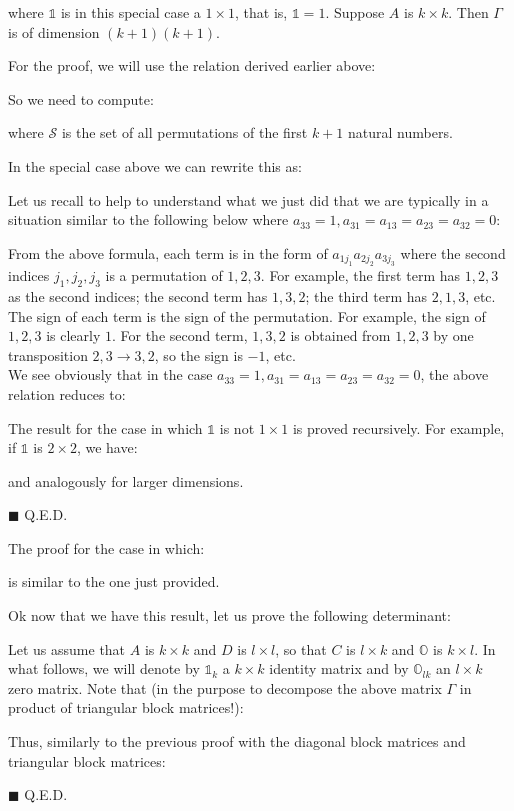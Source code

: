 	where $\mathds{1}$ is in this special case a $1\times 1$, that is, $\mathds{1}=1$. Suppose $A$ is $k \times k$. Then $\Gamma$ is of dimension $(k+1)(k+1)$.  
	
	For the proof, we will use the relation derived earlier above:
	
	\begin{dem}
	So we need to compute:
	
	where $\mathcal{S}$ is the set of all permutations of the first $k+1$ natural numbers.
	
	In the special case above we can rewrite this as:
	
	\begin{tcolorbox}[title=Remark,colframe=black,arc=10pt]
	Let us recall to help to understand what we just did that we are typically in a situation similar to the following below where $a_{33}=1,a_{31}=a_{13}=a_{23}=a_{32}=0$:
	
	From the above formula, each term is in the form of $a_{1j_1}a_{2j_2}a_{3j_3}$ where the second indices $j_1,j_2,j_3$ is a permutation of $1,2,3$. For example, the first term has $1,2,3$ as the second indices; the second term has $1,3,2$; the third term has $2,1,3$, etc.\\
	
	The sign of each term is the sign of the permutation. For example, the sign of $1,2,3$ is clearly $1$. For the second term, $1,3,2$ is obtained from $1,2,3$ by one transposition $2,3\rightarrow3,2$, so the sign is $-1$, etc.\\
	
	We see obviously that in the case $a_{33}=1,a_{31}=a_{13}=a_{23}=a_{32}=0$, the above relation reduces to:
	
	\end{tcolorbox}
	The result for the case in which $\mathds{1}$ is not $1\times 1$ is proved recursively. For example, if $\mathds{1}$ is $2\times 2$, we have:
	
	and analogously for larger dimensions.
	\begin{flushright}
		$\blacksquare$  Q.E.D.
	\end{flushright}
	\end{dem}
	The proof for the case in which:
	
	is similar to the one just provided.
	
	Ok now that we have this result, let us prove the following determinant:
	
	
	\begin{dem}
	Let us assume that $A$ is $k \times k$ and $D$ is $l \times l$, so that $C$ is $l \times k$ and $\mathds{O}$ is $k \times l$. In what follows, we will denote by $\mathds{1}_k$ a $k \times k$ identity matrix and by $\mathds{O}_{lk}$ an $l\times k$ zero matrix. Note that (in the purpose to decompose the above matrix $\Gamma$ in product of triangular block matrices!):
	
	Thus, similarly to the previous proof with the diagonal block matrices and triangular block matrices:
	
	\begin{flushright}
		$\blacksquare$  Q.E.D.
	\end{flushright}
	\end{dem}
	
